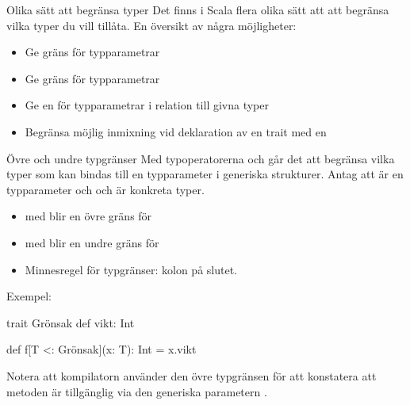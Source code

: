 



\begin{Slide}{Olika sätt att begränsa typer}
Det finns i Scala flera olika sätt att att begränsa vilka typer du vill tillåta. En översikt av några möjligheter:
\begin{itemize}
  \item Ge  gräns för typparametrar 
  \item Ge  gräns för typparametrar 
  \item Ge en  för typparametrar i relation till givna typer 
  \item Begränsa möjlig inmixning vid deklaration av en trait med en   
\end{itemize}
\end{Slide}

\begin{Slide}{Övre och undre typgränser}
Med typoperatorerna \code{<:} och \code{>:} går det att begränsa vilka typer som kan bindas till en typparameter i generiska strukturer. Antag att  är en typparameter och  och  är konkreta typer. 
\begin{itemize}
  \item med  blir  en övre gräns  för   
  \item med  blir  en undre gräns  för   
  \item Minnesregel för typgränser: kolon på slutet.
\end{itemize} 
\pause
Exempel: 
\begin{Code}
  trait Grönsak { def vikt: Int }

  def f[T <: Grönsak](x: T): Int = x.vikt
\end{Code}

Notera att kompilatorn använder den övre typgränsen för att konstatera att metoden  är tillgänglig via den generiska parametern .

\end{Slide}

